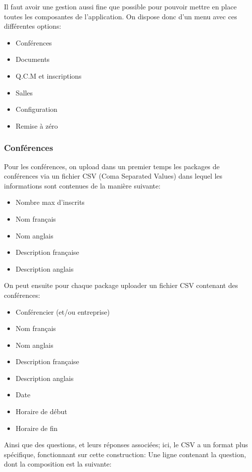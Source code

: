 Il faut avoir une gestion aussi fine que possible pour pouvoir mettre en place toutes les composantes de l'application.
On dispose donc d'un menu avec ces différentes options:

    \begin{itemize}
    \item Conférences
    \item Documents
    \item Q.C.M et inscriptions
    \item Salles
    \item Configuration
    \item Remise à zéro
    \end{itemize}

            \subsubsection{Conférences}

Pour les conférences, on upload dans un premier temps les packages de conférences via un fichier CSV (Coma Separated Values)
dans lequel les informations sont contenues de la manière suivante:

    \begin{itemize}
    \item Nombre max d'inscrits
    \item Nom français
    \item Nom anglais
    \item Description française
    \item Description anglais
    \end{itemize}

On peut ensuite pour chaque package uploader un fichier CSV contenant des conférences:

    \begin{itemize}
    \item Conférencier (et/ou entreprise)
    \item Nom français
    \item Nom anglais
    \item Description française
    \item Description anglais
    \item Date
    \item Horaire de début
    \item Horaire de fin
    \end{itemize}

Ainsi que des questions, et leurs réponses associées; ici, le CSV a un format plus spécifique, fonctionnant sur cette construction:
Une ligne contenant la question, dont la composition est la suivante:

